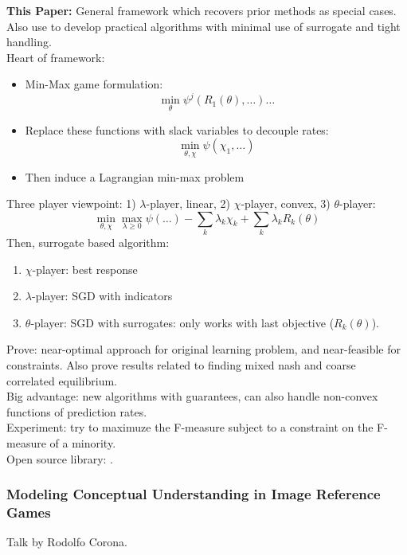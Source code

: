 {\bf This Paper:} General framework which recovers prior methods as special cases. Also use to develop practical algorithms with minimal use of surrogate and tight handling. \\

Heart of framework:
\begin{itemize}
    \item Min-Max game formulation:
    \[
    \min_{\theta} \psi^j(R_1(\theta), \ldots) \ldots
    \]
    \item Replace these functions with slack variables to decouple rates:
    \[
    \min_{\theta, \chi} \psi(\chi_1, \ldots)
    \]
    \item Then induce a Lagrangian min-max problem
\end{itemize}

Three player viewpoint: 1) $\lambda$-player, linear, 2) $\chi$-player, convex, 3) $\theta$-player:
\[
\min_{\theta, \chi}\max_{\lambda \geq 0} \psi(\ldots) - \sum_k \lambda_k \chi_k + \sum_k \lambda_k R_k(\theta)
\]
Then, surrogate based algorithm:
\begin{enumerate}
    \item $\chi$-player: best response
    \item $\lambda$-player: SGD with indicators
    \item $\theta$-player: SGD with surrogates: only works with last objective ($R_k(\theta)$).
\end{enumerate}

Prove: near-optimal approach for original learning problem, and near-feasible for constraints. Also prove results related to finding mixed nash and coarse correlated equilibrium. \\

Big advantage: new algorithms with guarantees, can also handle non-convex functions of prediction rates. \\

Experiment: try to maximuze the F-measure subject to a constraint on the F-measure of a minority. \\

Open source library: .


\subsubsection{Modeling Conceptual Understanding in Image Reference Games}

Talk by Rodolfo Corona. \\

